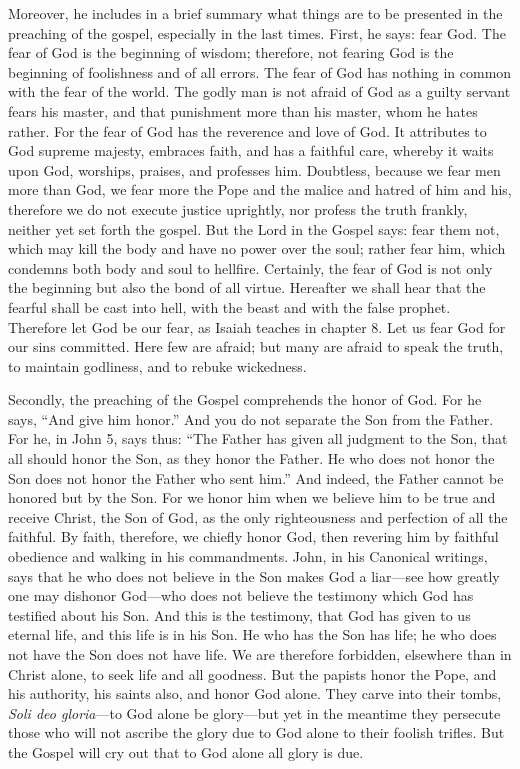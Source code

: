Moreover, he includes in a brief summary what things are to be presented in the preaching of the gospel, especially in the last times. First, he says: fear God. The fear of God is the beginning of wisdom; therefore, not fearing God is the beginning of foolishness and of all errors. The fear of God has nothing in common with the fear of the world. The godly man is not afraid of God as a guilty servant fears his master, and that punishment more than his master, whom he hates rather. For the fear of God has the reverence and love of God. It attributes to God supreme majesty, embraces faith, and has a faithful care, whereby it waits upon God, worships, praises, and professes him. Doubtless, because we fear men more than God, we fear more the Pope and the malice and hatred of him and his, therefore we do not execute justice uprightly, nor profess the truth frankly, neither yet set forth the gospel. But the Lord in the Gospel says: fear them not, which may kill the body and have no power over the soul; rather fear him, which condemns both body and soul to hellfire. Certainly, the fear of God is not only the beginning but also the bond of all virtue. Hereafter we shall hear that the fearful shall be cast into hell, with the beast and with the false prophet. Therefore let God be our fear, as Isaiah teaches in chapter 8. Let us fear God for our sins committed. Here few are afraid; but many are afraid to speak the truth, to maintain godliness, and to rebuke wickedness.

Secondly, the preaching of the Gospel comprehends the honor of God. For he says, “And give him honor.” And you do not separate the Son from the Father. For he, in John 5, says thus: “The Father has given all judgment to the Son, that all should honor the Son, as they honor the Father. He who does not honor the Son does not honor the Father who sent him.” And indeed, the Father cannot be honored but by the Son. For we honor him when we believe him to be true and receive Christ, the Son of God, as the only righteousness and perfection of all the faithful. By faith, therefore, we chiefly honor God, then revering him by faithful obedience and walking in his commandments. John, in his Canonical writings, says that he who does not believe in the Son makes God a liar—see how greatly one may dishonor God—who does not believe the testimony which God has testified about his Son. And this is the testimony, that God has given to us eternal life, and this life is in his Son. He who has the Son has life; he who does not have the Son does not have life. We are therefore forbidden, elsewhere than in Christ alone, to seek life and all goodness. But the papists honor the Pope, and his authority, his saints also, and honor God alone. They carve into their tombs, \textit{Soli deo gloria}—to God alone be glory—but yet in the meantime they persecute those who will not ascribe the glory due to God alone to their foolish trifles. But the Gospel will cry out that to God alone all glory is due.

